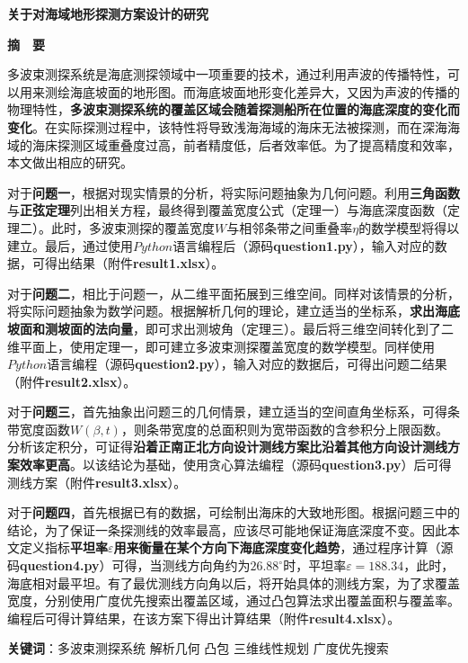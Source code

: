 \thispagestyle{empty}   %

\begin{center}
    \textbf{\fontsize{20}{1.5}关于对海域地形探测方案设计的研究}

    \textbf{摘　要}
\end{center}






多波束测探系统是海底测探领域中一项重要的技术，通过利用声波的传播特性，可以用来测绘海底坡面的地形图。而海底坡面地形变化差异大，又因为声波的传播的物理特性，\textbf{多波束测探系统的覆盖区域会随着探测船所在位置的海底深度的变化而变化}。在实际探测过程中，该特性将导致浅海海域的海床无法被探测，而在深海海域的海床探测区域重叠度过高，前者精度低，后者效率低。为了提高精度和效率，本文做出相应的研究。

对于\textbf{问题一}，根据对现实情景的分析，将实际问题抽象为几何问题。利用\textbf{三角函数}与\textbf{正弦定理}列出相关方程，最终得到覆盖宽度公式（定理一）与海底深度函数（定理二）。此时，多波束测探的覆盖宽度$W$与相邻条带之间重叠率$\eta$的数学模型将得以建立。最后，通过使用$Python$语言编程后（源码\textbf{question1.py}），输入对应的数据，可得出结果（附件\textbf{result1.xlsx}）。

对于\textbf{问题二}，相比于问题一，从二维平面拓展到三维空间。同样对该情景的分析，将实际问题抽象为数学问题。根据解析几何的理论，建立适当的坐标系，\textbf{求出海底坡面和测坡面的法向量}，即可求出测坡角（定理三）。最后将三维空间转化到了二维平面上，使用定理一，即可建立多波束测探覆盖宽度的数学模型。同样使用$Python$语言编程（源码\textbf{question2.py}），输入对应的数据后，可得出问题二结果（附件\textbf{result2.xlsx}）。

对于\textbf{问题三}，首先抽象出问题三的几何情景，建立适当的空间直角坐标系，可得条带宽度函数$W(\beta,t)$，则条带宽度的总面积则为宽带函数的含参积分上限函数。分析该定积分，可证得\textbf{沿着正南正北方向设计测线方案比沿着其他方向设计测线方案效率更高}。以该结论为基础，使用贪心算法编程（源码\textbf{question3.py}）后可得测线方案（附件\textbf{result3.xlsx}）。

对于\textbf{问题四}，首先根据已有的数据，可绘制出海床的大致地形图。根据问题三中的结论，为了保证一条探测线的效率最高，应该尽可能地保证海底深度不变。因此本文定义指标\textbf{平坦率$\varepsilon$用来衡量在某个方向下海底深度变化趋势}，通过程序计算（源码\textbf{question4.py}）可得，当测线方向角约为$26.88^\circ$时，平坦率$\varepsilon=188.34$，此时，海底相对最平坦。有了最优测线方向角以后，将开始具体的测线方案，为了求覆盖宽度，分别使用广度优先搜索出覆盖区域，通过凸包算法求出覆盖面积与覆盖率。编程后可得计算结果，在该方案下得出计算结果（附件\textbf{result4.xlsx}）。

\quad\newline
\newline
\textbf{关键词}：多波束测探系统 \quad 解析几何 \quad 凸包 \quad 三维线性规划 \quad 广度优先搜索
